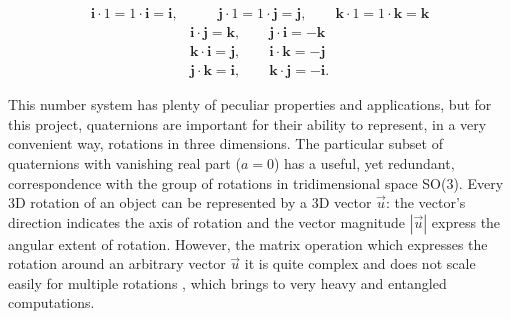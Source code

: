 \begin{align}
    \bm{i} \cdot 1 = 1 \cdot \bm{i} = \bm{i}, & \qquad  \bm{j} \cdot 1 = 1 \cdot \bm{j} = \bm{j}, \qquad \bm{k} \cdot 1 = 1 \cdot \bm{k} = \bm{k} \label{eq:Ham_prod}\\
    & \bm{i} \cdot \bm{j}= \bm{k}, \qquad \bm{j} \cdot \bm{i}= -\bm{k} \nonumber \\
    & \bm{k} \cdot \bm{i}= \bm{j}, \qquad \bm{i} \cdot \bm{k}= -\bm{j} \nonumber \\
    & \bm{j} \cdot \bm{k}= \bm{i}, \qquad \bm{k} \cdot \bm{j}= -\bm{i}. \nonumber
\end{align}

This number system has plenty of peculiar properties and applications, but for this project, quaternions are important for their ability to represent, in a very convenient way, rotations in three dimensions. The particular subset of quaternions with vanishing real part ($a=0$) has a useful, yet redundant, correspondence with the group of rotations in tridimensional space SO(3). Every 3D rotation of an object can be represented by a 3D vector $\vec u$: the vector's direction indicates the axis of rotation and the vector magnitude $|\vec u|$ express the angular extent of rotation. However, the matrix operation which expresses the rotation around an arbitrary vector $\vec u$ it is quite complex and does not scale easily for multiple rotations \cite{10.1007/BFb0031048}, which brings to very heavy and entangled computations.

